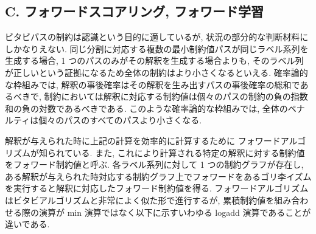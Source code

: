 \documentclass[twocolumn]{jarticle}     %
\begin{document}
\subsection*{C. フォワードスコアリング, フォワード学習}
ビタビパスの制約は認識という目的に適しているが, 状況の部分的な判断材料にしかなりえない. 同じ分割に対応する複数の最小制約値パスが同じラベル系列を生成する場合, 1 つのパスのみがその解釈を生成する場合よりも, そのラベル列が正しいという証拠になるため全体の制約はより小さくなるといえる.
確率論的な枠組みでは, 解釈の事後確率はその解釈を生み出すパスの事後確率の総和であるべきで, 制約においては解釈に対応する制約値は個々のパスの制約の負の指数和の負の対数であるべきである. このような確率論的な枠組みでは, 全体のペナルティは個々のパスのすべてのパスより小さくなる. 
\par
解釈が与えられた時に上記の計算を効率的に計算するために フォワードアルゴリズムが知られている. また, これにより計算される特定の解釈に対する制約値をフォワード制約値と呼ぶ.
各ラベル系列に対して 1 つの制約グラフが存在し, ある解釈が与えられた時対応する制約グラフ上でフォワードをあるゴリ李イズムを実行すると解釈に対応したフォワード制約値を得る. フォワードアルゴリズムはビタビアルゴリズムと非常によく似た形で進行するが, 累積制約値を組み合わせる際の演算が min 演算ではなく以下に示すいわゆる logadd 演算であることが違いである. 
\end{document}
